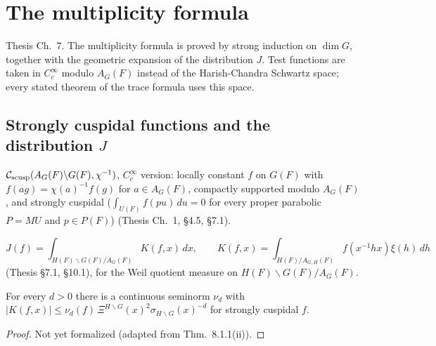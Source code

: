 \chapter{The multiplicity formula}
\label{chap:multformula}
Thesis Ch.~7. The multiplicity formula is proved by strong induction on $\dim G$, together with the
geometric expansion of the distribution $J$. Test functions are taken in $C_c^\infty$ modulo $A_G(F)$
instead of the Harish-Chandra Schwartz space; every stated theorem of the trace formula uses this space.

\section{\texorpdfstring{Strongly cuspidal functions and the distribution $J$}{Strongly cuspidal functions and the distribution J}}
\begin{definition}
\label{ScuspTestFn}
\leanok
{}
$\mathcal{C}_{\mathrm{scusp}}(A_G(F)\backslash G(F),\chi^{-1})$, $C_c^\infty$ version: locally constant $f$ on $G(F)$ with
$f(ag)=\chi(a)^{-1}f(g)$ for $a\in A_G(F)$, compactly supported modulo $A_G(F)$, and strongly cuspidal
($\int_{U(F)}f(pu)\,du=0$ for every proper parabolic $P=MU$ and $p\in P(F)$) (Thesis Ch.~1, \S4.5, \S7.1).
\end{definition}

\begin{definition}
\label{distribJ}
\leanok
{}
\[ J(f)=\int_{H(F)\backslash G(F)/A_G(F)}K(f,x)\,dx,\qquad K(f,x)=\int_{H(F)/A_{G,H}(F)}f(x^{-1}hx)\xi(h)\,dh \]
(Thesis \S7.1, \S10.1), for the Weil quotient measure on $H(F)\backslash G(F)/A_G(F)$.
\end{definition}

\begin{theorem}
\label{kernelK_bound_scusp}
\leanok
{}
For every $d>0$ there is a continuous seminorm $\nu_d$ with
$|K(f,x)|\le\nu_d(f)\,\Xi^{H\backslash G}(x)^2\sigma_{H\backslash G}(x)^{-d}$ for strongly cuspidal $f$.
\end{theorem}
\begin{proof}
Not yet formalized (adapted from \cite{BP} Thm.~8.1.1(ii)).
\end{proof}

